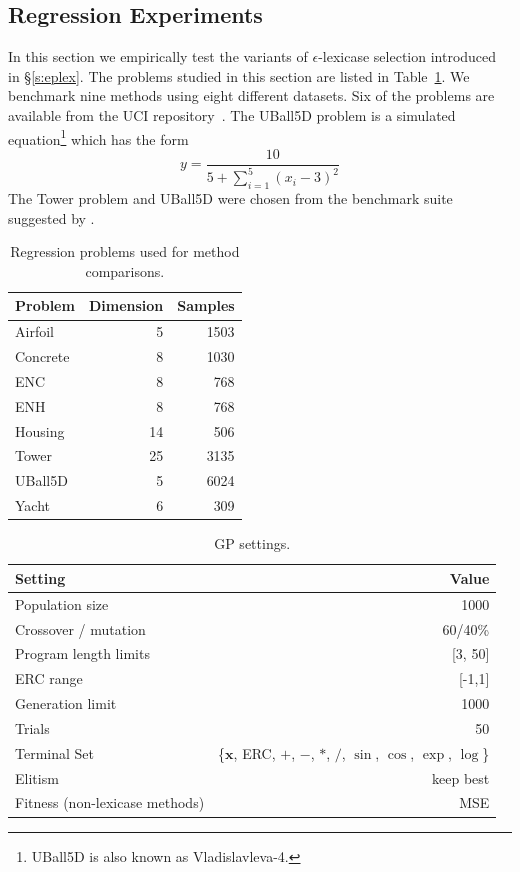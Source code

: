 \documentclass[twoside]{article}
\begin{document}
\subsection{Regression Experiments} \label{s:exp}
In this section we empirically test the variants of $\epsilon$-lexicase selection introduced in \S\ref{s:eplex}. The problems studied in this section are listed in Table~\ref{tbl:regression}. We benchmark nine methods using eight different datasets. Six of the problems are available from the UCI repository~\citep{lichman_uci_2013}. The UBall5D problem is a simulated equation\footnote{UBall5D is also known as Vladislavleva-4.} which has the form \[ y = \frac{10}{5+\sum_{i=1}^5{(x_i-3)^2}}\] The Tower problem and UBall5D were chosen from the benchmark suite suggested by \cite{white_better_2012}. 
\begin{table}
\centering
\scriptsize
\caption{Regression problems used for method comparisons.}\label{tbl:regression}
\begin{tabularx}{0.5\columnwidth}{X r r } \toprule
Problem & Dimension & Samples \\ \midrule
Airfoil & 5	& 1503 \\
Concrete	& 	8	& 1030	\\
ENC & 8 & 768 \\
ENH & 8 & 768 \\
Housing & 14 & 506 \\
Tower & 25 & 3135 \\
UBall5D & 5 & 6024 \\ 
Yacht	& 6	&	309	\\ \midrule
\end{tabularx}
\end{table}

\begin{table}
\centering
\scriptsize
\caption{GP settings.}\label{tbl:symreg_settings}
\begin{tabular}{lr} \toprule
Setting& Value \\ \midrule
Population size & 1000 \\
Crossover / mutation & 60/40\% \\
Program length limits & [3, 50] \\ 
ERC range & [-1,1] \\
Generation limit & 1000 \\
Trials & 50 \\
Terminal Set & \{$\mathbf{x}$, ERC, $+$, $-$, $*$, $/$, $\sin$, $\cos$, $\exp$, $\log$\}\\
Elitism & keep best \\
Fitness (non-lexicase methods) & MSE \\ \bottomrule
\end{tabular}
\end{table}
\end{document}
